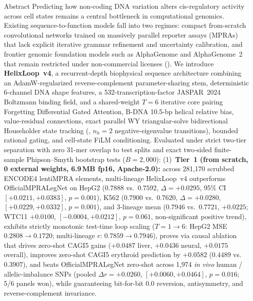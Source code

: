 \documentclass[10.5pt,a4paper]{article}
\begin{document}

\begin{abstractbox}{Abstract}
Predicting how non-coding DNA variation alters cis-regulatory activity across cell states remains a central bottleneck in computational genomics. Existing sequence-to-function models fall into two regimes: compact from-scratch convolutional networks trained on massively parallel reporter assays (MPRAs) that lack explicit iterative grammar refinement and uncertainty calibration, and frontier genomic foundation models such as AlphaGenome and AlphaGenome~2 that remain restricted under non-commercial licenses (). We introduce \textbf{HelixLoop~v4}, a recurrent-depth biophysical sequence architecture combining an AdamW-regularized reverse-complement parameter-sharing stem, deterministic 6-channel DNA shape features, a 532-transcription-factor JASPAR~2024 Boltzmann binding field, and a shared-weight $T=6$ iterative core pairing Forgetting Differential Gated Attention, B-DNA 10.5-bp helical relative bias, value-residual connections, exact parallel WY triangular-solve bidirectional Householder state tracking (, $n_h=2$ negative-eigenvalue transitions), bounded rational gating, and cell-state FiLM conditioning. Evaluated under strict two-tier separation with zero 31-mer overlap to test splits and exact two-sided finite-sample Phipson--Smyth bootstrap tests ($B=2{,}000$):
(1)~\textbf{Tier~1 (from scratch, 0 external weights, 6.9\,MB fp16, Apache-2.0):} across 281,170 scrubbed ENCODE4 lentiMPRA elements, multi-lineage HelixLoop~v4 outperforms OfficialMPRALegNet on HepG2 ($0.7888$ vs.\ $0.7592$, $\Delta=+0.0295$, 95\% CI $[+0.0211,+0.0383]$, $p=0.001$), K562 ($0.7900$ vs.\ $0.7620$, $\Delta=+0.0280$, $[+0.0229,+0.0332]$, $p=0.001$), and 3-lineage mean ($0.7946$ vs.\ $0.7721$, $+0.0225$; WTC11 $+0.0100$, $[-0.0004,+0.0212]$, $p=0.061$, non-significant positive trend), exhibits strictly monotonic test-time loop scaling ($T=1\to 6$: HepG2 MSE $0.2808\to 0.1720$; multi-lineage $r$: $0.7859\to 0.7946$), proves via causal ablation that  drives zero-shot CAGI5 gains ($+0.0487$ liver, $+0.0436$ neural, $+0.0175$ overall), improves zero-shot CAGI5 erythroid prediction by $+0.0582$ ($0.4489$ vs.\ $0.3907$), and beats OfficialMPRALegNet zero-shot across 1,974 \emph{in vivo} human / allelic-imbalance SNPs (pooled $\Delta r=+0.0260$, $[+0.0060,+0.0464]$, $p=0.016$; 5/6 panels won), while guaranteeing bit-for-bit $0.0$ reversion, antisymmetry, and reverse-complement invariance.

\end{abstractbox}
\end{document}
